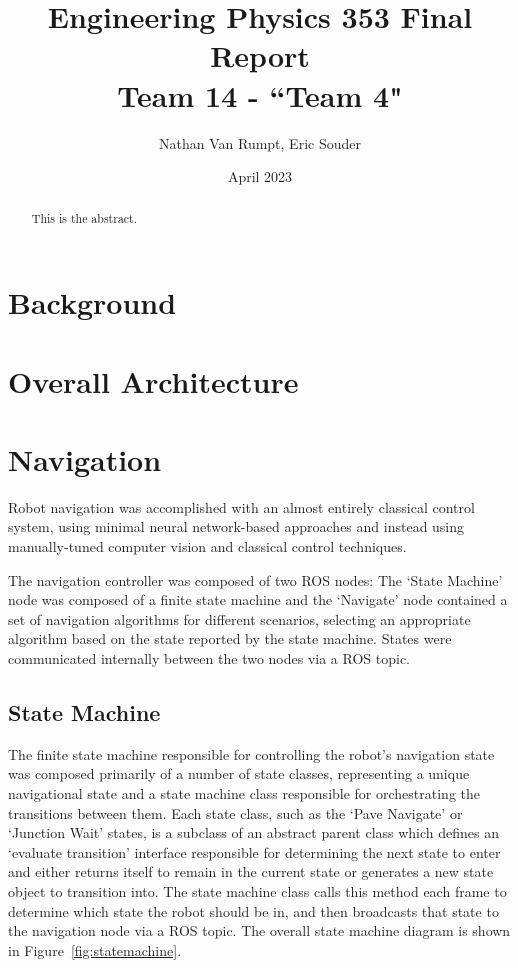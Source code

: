 \documentclass[titlepage]{article}
\title{%
    Engineering Physics 353 Final Report \\
    \large Team 14 - ``Team 4"}
\author{Nathan Van Rumpt, Eric Souder}
\date{April 2023}
\begin{document}
\maketitle

\begin{abstract}
    This is the abstract.
\end{abstract}

\section{Background}

\section{Overall Architecture}

\section{Navigation}
    Robot navigation was accomplished with an almost entirely classical control system, using minimal neural network-based approaches and instead using manually-tuned computer vision and classical control techniques. 

    The navigation controller was composed of two ROS nodes: The `State Machine' node was composed of a finite state machine and the `Navigate' node contained a set of navigation algorithms for different scenarios, selecting an appropriate algorithm based on the state reported by the state machine. States were communicated internally between the two nodes via a ROS topic.
    
    \subsection{State Machine}
        The finite state machine responsible for controlling the robot's navigation state was composed primarily of a number of state classes, representing a unique navigational state and a state machine class responsible for orchestrating the transitions between them. Each state class, such as the `Pave Navigate' or `Junction Wait' states, is a subclass of an abstract parent class which defines an `evaluate transition' interface responsible for determining the next state to enter and either returns itself to remain in the current state or generates a new state object to transition into. The state machine class calls this method each frame to determine which state the robot should be in, and then broadcasts that state to the navigation node via a ROS topic. The overall state machine diagram is shown in Figure~\ref{fig:statemachine}.
\end{document}
